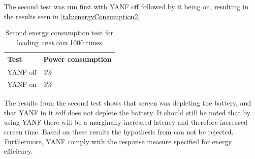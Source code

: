 \documentclass[main.tex]{subfiles}
\begin{document}
The second test was run first with YANF off followed by it being on, resulting in the results seen in \autoref{tab:energyConsumption2}


\begin{table}[H]
    \centering
    \begin{tabular}{|l|l|}\hline
        \textbf{Test}   & \textbf{Power consumption}    \\ \hline
        YANF off         & 3\%                          \\ \hline
        YANF on        & 3\%                          \\ \hline
    \end{tabular}
    \caption{Second energy consumption test for loading \textit{cnet.com} 1000 times}
    \label{tab:energyConsumption2}
\end{table}

The results from the second test shows that screen was depleting the battery, and that YANF in it self does not deplete the battery. It should still be noted that by using YANF there will be a marginally increased latency and therefore increased screen time. Based on these results the hypothesis from  can not be rejected. Furthermore, YANF comply with the response measure specified for energy efficiency.




\end{document}
